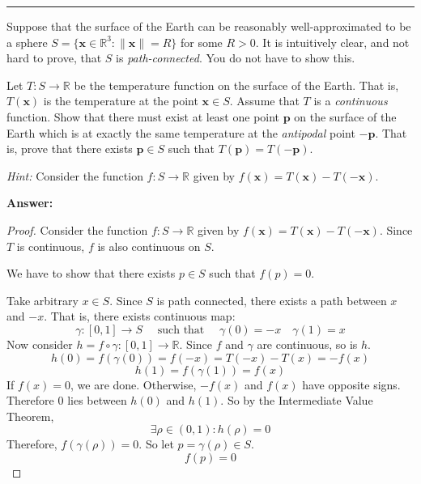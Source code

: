 \documentclass[11pt]{article}
\newcounter{problem}
\newenvironment{problem}{%
    \newpage
    \refstepcounter{problem}%
    \Needspace{7\baselineskip}%
    \par\vspace{0.7em}%
    \noindent\textcolor{courseblue}{\rule{\textwidth}{0.4pt}}%
    \par\vspace{0.5em}%
    \begin{list}{}{%
        \setlength{\leftmargin}{2.3em}%
        \setlength{\labelwidth}{1.8em}%
        \setlength{\labelsep}{0.5em}%
        \setlength{\topsep}{0pt}%
        \setlength{\partopsep}{0pt}%
    }%
    \item[{[\theproblem]}]
}{%
    \end{list}
    \par\vspace{0.5em}
}
\newenvironment{answer}{%
    \Needspace{4\baselineskip}%
    \par\vspace{0.35em}
    \noindent\textbf{Answer:}\par
}{%
    \par\vspace{0.25em}
}
\begin{document}
\begin{problem}
Suppose that the surface of the Earth can be reasonably well-approximated
 to be a sphere $S=\{\mathbf{x}\in\mathbb{R}^3:\lVert\mathbf{x}\rVert=R\}$
for some $R>0$. It is intuitively clear, and not hard to prove, that $S$
is \emph{path-connected}. You do not have to show this.

Let $T:S\to\mathbb{R}$ be the temperature function on the surface of the
Earth. That is, $T(\mathbf{x})$ is the temperature at the point
$\mathbf{x}\in S$. Assume that $T$ is a \emph{continuous} function. Show
that there must exist at least one point $\mathbf{p}$ on the surface of
the Earth which is at exactly the same temperature at the \emph{antipodal}
point $-\mathbf{p}$. That is, prove that there exists $\mathbf{p}\in S$
such that $T(\mathbf{p})=T(-\mathbf{p})$.

\emph{Hint:} Consider the function $f:S\to\mathbb{R}$ given by
$f(\mathbf{x})=T(\mathbf{x})-T(-\mathbf{x})$.
\begin{answer}
\begin{proof}
    Consider the function $f:S\to\mathbb{R}$ given by $f(\mathbf{x})=T(\mathbf{x})-T(-\mathbf{x})$. Since $T$ is continuous, $f$ is also continuous on $S$.

    We have to show that there exists $p\in S$ such that $f(p) = 0$.

    Take arbitrary $x\in S$. Since $S$ is path connected, there exists a path between $x$ and $-x$. 
    That is, there exists continuous map:
    \[\gamma : [0,1] \to S \quad \text{ such that }\quad \gamma(0) = -x \quad \gamma(1) = x\]
    Now consider $h = f \circ \gamma : [0,1] \to\mathbb{R}$.
    Since $f$ and $\gamma$ are continuous, so is $h$.
    \[h(0) = f(\gamma(0)) = f(-x) = T(-x) - T(x) = -f(x)\]
    \[h(1) = f(\gamma(1)) = f(x)\]
    If $f(x) = 0$, we are done. Otherwise, $-f(x)$ and $f(x)$ have opposite signs.
    Therefore $0$ lies between $h(0)$ and $h(1)$.
    So by the Intermediate Value Theorem,
    \[\exists \rho\in(0,1): h(\rho) = 0\]
    Therefore, $f(\gamma(\rho)) = 0$. So let $p = \gamma(\rho)\in S$.
    \[f(p) = 0\]
\end{proof}
\end{answer}
\end{problem}
\end{document}
